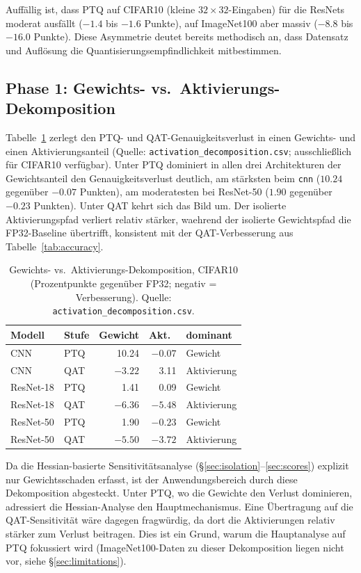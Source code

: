 Auffällig ist, dass PTQ auf CIFAR10 (kleine $32\times32$-Eingaben) für die ResNets moderat ausfällt ($-1.4$ bis $-1.6$ Punkte), auf ImageNet100 aber massiv ($-8.8$ bis $-16.0$ Punkte). Diese Asymmetrie deutet bereits methodisch an, dass Datensatz und Auflösung die Quantisierungsempfindlichkeit mitbestimmen.

\subsection{Phase 1: Gewichts- vs.\ Aktivierungs-Dekomposition}
\label{sec:phase1-results}

Tabelle~\ref{tab:decomposition} zerlegt den PTQ- und QAT-Genauigkeitsverlust in einen Gewichts- und einen Aktivierungsanteil (Quelle: \texttt{activation\_decomposition.csv}; ausschließlich für CIFAR10 verfügbar). Unter PTQ dominiert in allen drei Architekturen der Gewichtsanteil den Genauigkeitsverlust deutlich, am stärksten beim \texttt{cnn} ($10.24$ gegenüber $-0.07$ Punkten), am moderatesten bei ResNet-50 ($1.90$ gegenüber $-0.23$ Punkten). Unter QAT kehrt sich das Bild um. Der isolierte Aktivierungspfad verliert relativ stärker, waehrend der isolierte Gewichtspfad die FP32-Baseline übertrifft, konsistent mit der QAT-Verbesserung aus Tabelle~\ref{tab:accuracy}.

\begin{table}[t]
\centering
\small
\caption{Gewichts- vs.\ Aktivierungs-Dekomposition, CIFAR10 (Prozentpunkte gegenüber FP32; negativ = Verbesserung). Quelle: \texttt{activation\_decomposition.csv}.}
\label{tab:decomposition}
\begin{tabular}{llrrl}
\toprule
Modell & Stufe & Gewicht & Akt.\ & dominant \\
\midrule
CNN & PTQ & 10.24 & $-0.07$ & Gewicht \\
CNN & QAT & $-3.22$ & 3.11 & Aktivierung \\
ResNet-18 & PTQ & 1.41 & 0.09 & Gewicht \\
ResNet-18 & QAT & $-6.36$ & $-5.48$ & Aktivierung \\
ResNet-50 & PTQ & 1.90 & $-0.23$ & Gewicht \\
ResNet-50 & QAT & $-5.50$ & $-3.72$ & Aktivierung \\
\bottomrule
\end{tabular}
\end{table}

Da die Hessian-basierte Sensitivitätsanalyse (\S\ref{sec:isolation}--\ref{sec:scores}) explizit nur Gewichtsschaden erfasst, ist der Anwendungsbereich durch diese Dekomposition abgesteckt. Unter PTQ, wo die Gewichte den Verlust dominieren, adressiert die Hessian-Analyse den Hauptmechanismus. Eine Übertragung auf die QAT-Sensitivität wäre dagegen fragwürdig, da dort die Aktivierungen relativ stärker zum Verlust beitragen. Dies ist ein Grund, warum die Hauptanalyse auf PTQ fokussiert wird (ImageNet100-Daten zu dieser Dekomposition liegen nicht vor, siehe \S\ref{sec:limitations}).
\par\medskip

